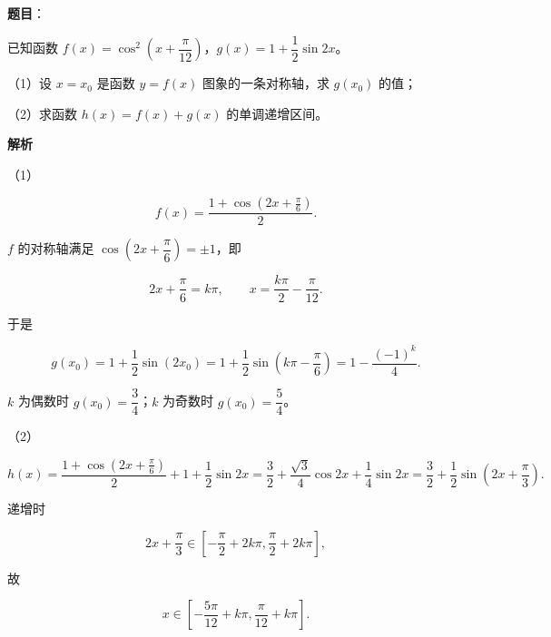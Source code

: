 \begin{answer}

\textbf{题目}：

已知函数 $f(x)=\cos^2\left(x+\dfrac{\pi}{12}\right)$，$g(x)=1+\dfrac12\sin2x$。

（1）设 $x=x_0$ 是函数 $y=f(x)$ 图象的一条对称轴，求 $g(x_0)$ 的值；

（2）求函数 $h(x)=f(x)+g(x)$ 的单调递增区间。

\textbf{解析}

（1）

\nopagebreak[4]
\[f(x)=\frac{1+\cos\left(2x+\frac{\pi}6\right)}2.\]

$f$ 的对称轴满足 $\cos\left(2x+\dfrac{\pi}6\right)=\pm1$，即

\nopagebreak[4]
\[2x+\frac{\pi}6=k\pi,\qquad x=\frac{k\pi}2-\frac{\pi}{12}.\]

于是

\nopagebreak[4]
\[g(x_0)=1+\frac12\sin(2x_0)=1+\frac12\sin\left(k\pi-\frac{\pi}6\right)=1-\frac{(-1)^k}4.\]

$k$ 为偶数时 $g(x_0)=\dfrac34$；$k$ 为奇数时 $g(x_0)=\dfrac54$。

（2）

\nopagebreak[4]
\[h(x)=\frac{1+\cos\left(2x+\frac{\pi}6\right)}2+1+\frac12\sin2x
=\frac32+\frac{\sqrt3}4\cos2x+\frac14\sin2x
=\frac32+\frac12\sin\left(2x+\frac{\pi}3\right).\]

递增时

\nopagebreak[4]
\[2x+\frac{\pi}3\in\left[-\frac{\pi}2+2k\pi,\frac{\pi}2+2k\pi\right],\]

故

\nopagebreak[4]
\[x\in\left[-\frac{5\pi}{12}+k\pi,\frac{\pi}{12}+k\pi\right].\]


\end{answer}
